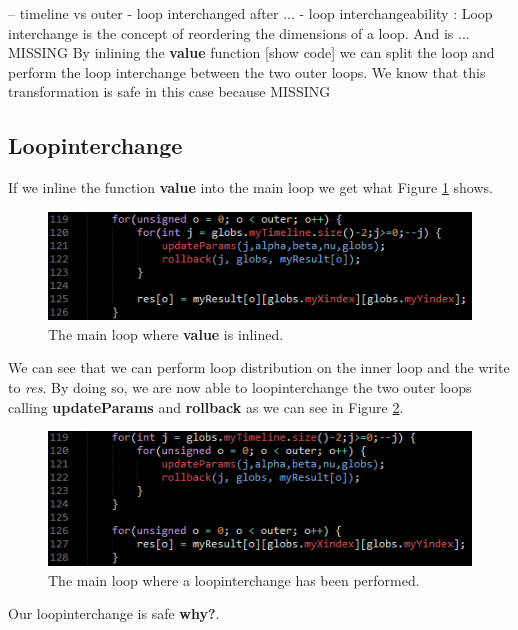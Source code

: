 --
timeline vs outer - loop interchanged after ...
- loop interchangeability
: Loop interchange is the concept of reordering the dimensions of a loop. And
is ... MISSING
By inlining the \textbf{value} function [show code] we can split the loop and
perform the loop interchange between the two outer loops.
We know that this transformation is safe in this case because MISSING

\subsection{Loopinterchange}
If we inline the function \textbf{value} into the main loop we get what Figure
\ref{fig:inline_value} shows.

\begin{figure}[!ht]
	\centering
		\includegraphics[scale=1]{input/figures/inline_value.png}
		\caption{The main loop where \textbf{value} is inlined.\label{fig:inline_value}}
\end{figure}

We can see that we can perform loop distribution on the inner loop and the
write to \emph{res}. By doing so, we are now able to loopinterchange the two
outer loops calling \textbf{updateParams} and \textbf{rollback} as we can see in
Figure \ref{fig:main_loopinterchange}.

\begin{figure}[!ht]
	\centering
		\includegraphics[scale=1]{input/figures/main_loopinterchange.png}
		\caption{The main loop where a loopinterchange has been performed.\label{fig:main_loopinterchange}}
\end{figure}

Our loopinterchange is safe \textbf{why?}.
